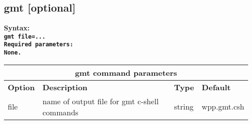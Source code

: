 \documentclass[11pt]{report}
\begin{document}


\subsection{gmt [optional]}
\label{keyword:gmt}
\begin{flushleft}\bf
Syntax:\\
\tt gmt file=...\\
\bf Required parameters:\\
\rm None.
\end{flushleft}
%
\begin{center}
\begin{tabular}{|l|p{8cm}|l|l|} \hline
\multicolumn{4}{|c|}{\bf gmt command parameters}\\ \hline
\bf{Option} & \bf{Description} & \bf{Type} & \bf{Default} \\ \hline \hline
file & name of output file for gmt c-shell commands & string & wpp.gmt.csh  \\ \hline
\end{tabular}
\end{center}
\end{document}
